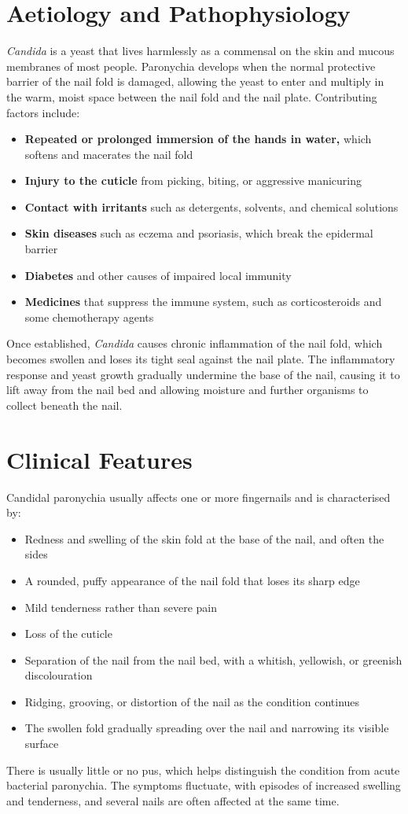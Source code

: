 \section*{Aetiology and Pathophysiology}
\textit{Candida} is a yeast that lives harmlessly as a commensal on the skin and mucous membranes of most people. Paronychia develops when the normal protective barrier of the nail fold is damaged, allowing the yeast to enter and multiply in the warm, moist space between the nail fold and the nail plate. Contributing factors include:
\begin{itemize}
    \item \textbf{Repeated or prolonged immersion of the hands in water,} which softens and macerates the nail fold
    \item \textbf{Injury to the cuticle} from picking, biting, or aggressive manicuring
    \item \textbf{Contact with irritants} such as detergents, solvents, and chemical solutions
    \item \textbf{Skin diseases} such as eczema and psoriasis, which break the epidermal barrier
    \item \textbf{Diabetes} and other causes of impaired local immunity
    \item \textbf{Medicines} that suppress the immune system, such as corticosteroids and some chemotherapy agents
\end{itemize}
Once established, \textit{Candida} causes chronic inflammation of the nail fold, which becomes swollen and loses its tight seal against the nail plate. The inflammatory response and yeast growth gradually undermine the base of the nail, causing it to lift away from the nail bed and allowing moisture and further organisms to collect beneath the nail.

\section*{Clinical Features}
Candidal paronychia usually affects one or more fingernails and is characterised by:
\begin{itemize}
    \item Redness and swelling of the skin fold at the base of the nail, and often the sides
    \item A rounded, puffy appearance of the nail fold that loses its sharp edge
    \item Mild tenderness rather than severe pain
    \item Loss of the cuticle
    \item Separation of the nail from the nail bed, with a whitish, yellowish, or greenish discolouration
    \item Ridging, grooving, or distortion of the nail as the condition continues
    \item The swollen fold gradually spreading over the nail and narrowing its visible surface
\end{itemize}
There is usually little or no pus, which helps distinguish the condition from acute bacterial paronychia. The symptoms fluctuate, with episodes of increased swelling and tenderness, and several nails are often affected at the same time.

